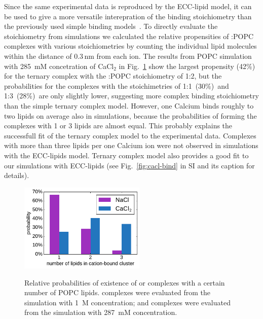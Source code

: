 \documentclass[aip,jcp,twocolumn]{revtex4}
\begin{document}
Since the same experimental data is reproduced by the ECC-lipid model,
it can be used to give a more versatile interepration of the binding stoichiometry than
the previously used simple binding models~\cite{altenbach84,macdonald87}. To directly evaluate the
stoichiometry from simulations we calculated the relative propensities of :POPC
complexes with various stoichiometries by counting the individual lipid
molecules within the distance of $0.3\,\mathrm{nm}$ from each  ion.
The results from POPC simulation with 285~mM concetration of CaCl$_2$ in
Fig.~\ref{fig:cacl_complexes} show the largest propensity (42\%) for the
ternary complex with the :POPC stoichiometry of 1:2, but 
the probabilities for the complexes with the stoichimetries of 1:1~(30\%)~and
1:3~(28\%)~are only slightly lower,
suggesting more complex binding stoichiometry than the simple ternary complex model.
However, one Calcium binds roughly to two lipids on average also in simulations,
because the probabilities of forming the complexes with 1 or 3 lipids are almost equal.  
This probably explains the successfull fit of the ternary complex model to the
experimental data. 
Complexes with more than three lipids per one Calcium ion were not observed in 
simulations with the ECC-lipids model.
Ternary complex model also provides a good fit 
to our simulations with ECC-lipids 
(see Fig.~\ref{fig:cacl-bind} in SI and its caption for details). 
\begin{figure}[tbp]
  \centering
  \includegraphics[width=6.0cm]{../Fig/ipython_nb/stoichiometry_NaCl-CaCl2_comparison_Ecc-lipids.pdf} \\
  \caption{\label{fig:cacl_complexes}
      Relative probabilities of existence of  or  complexes
      with a certain number of POPC lipids. 
       complexes were evaluated from the simulation with 1~M concentration;
      and  complexes were evaluated from the simulation with 287~mM concentration.
  }
\end{figure}
\end{document}
